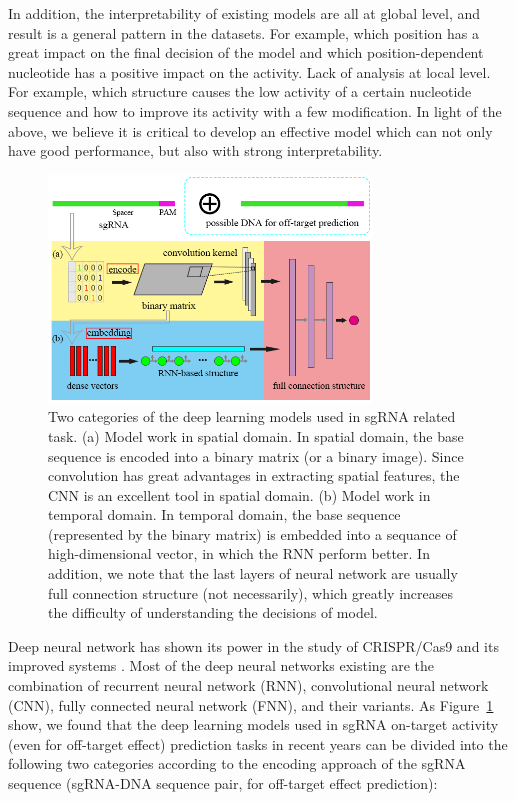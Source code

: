 \documentclass{bioinfo}
\begin{document}
 In addition, the interpretability of existing models are all at global level, and result is a general pattern in the datasets. 
For example, which position has a great impact on the final decision of the model and which position-dependent nucleotide has a positive impact on the activity. 
Lack of analysis at local level. 
For example, which structure causes the low activity of a certain nucleotide sequence and how to improve its activity with a few modification. 
In light of the above, we believe it is critical to develop an effective model which can not only have good performance, but also with strong interpretability.


\begin{figure}[!tpb]%
    \centerline{\includegraphics[width=86mm]{NEWcategory.png}}
    \caption{Two categories of the deep learning models used in sgRNA related task. 
    (a) Model work in spatial domain. 
    In spatial domain, the base sequence is encoded into a binary matrix (or a binary image). 
    Since convolution has great advantages in extracting spatial features, the CNN is an excellent tool in spatial domain. 
    (b) Model work in temporal domain. 
    In temporal domain, the base sequence (represented by the binary matrix) is embedded into a sequance of high-dimensional vector, 
    in which the RNN perform better.
    In addition, we note that the last layers of neural network are usually full connection structure (not necessarily), 
    which greatly increases the difficulty of understanding the decisions of model.
    }\label{fig:category}
\end{figure}

Deep neural network has shown its power in the study of CRISPR/Cas9 and its improved systems \citep{liu2019computational}. 
Most of the deep neural networks existing are the combination of recurrent neural network (RNN), convolutional neural network (CNN), fully connected neural network (FNN), and their variants. 
As Figure~\ref{fig:category} show,  
we found that the deep learning models used in sgRNA on-target activity (even for off-target effect) prediction tasks in recent years can be divided into the following two categories according to the encoding approach of the sgRNA sequence (sgRNA-DNA sequence pair, for off-target effect prediction):
\end{document}
